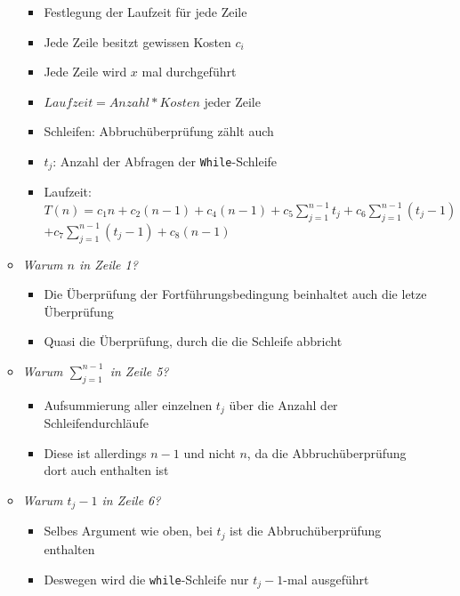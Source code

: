 \documentclass[
    12pt,
    a4paper,
    ngerman,
    color=3b,%
    marginpar=false,
    colorback=false,
    leqno,
]{tudaexercise}
\begin{document}
\begin{itemize}
\begin{itemize}
\begin{minipage}[t]{0.45\textwidth}
                        \vspace*{-2.5cm}
                        \begin{itemize}
                            \item Festlegung der Laufzeit für jede Zeile
                            \item Jede Zeile besitzt gewissen Kosten \texttt{$c_i$}
                            \item Jede Zeile wird $x$ mal durchgeführt
                            \item $Laufzeit = Anzahl * Kosten$ jeder Zeile
                            \item Schleifen: Abbruchüberprüfung zählt auch
                            \item \texttt{$t_j$}: Anzahl der Abfragen der \texttt{While}-Schleife
                            \item Laufzeit:
                            $T(n)=c_{1} n+c_{2}(n-1)+c_{4}(n-1)+c_{5} \sum_{j=1}^{n-1} t_{j}+c_{6} \sum_{j=1}^{n-1}\left(t_{j}-1\right)$\\$+c_{7} \sum_{j=1}^{n-1}\left(t_{j}-1\right)+c_{8}(n-1)$
                        \end{itemize}
                    \end{minipage}
                    \vspace*{-1.1em}
              \item \textit{Warum $n$ in Zeile 1?}
                    \begin{itemize}
                        \item Die Überprüfung der Fortführungsbedingung beinhaltet auch die letze Überprüfung
                        \item Quasi die Überprüfung, durch die die Schleife abbricht
                    \end{itemize}

              \item \textit{Warum $\sum^{n-1}_{j=1}$ in Zeile 5?}
                    \begin{itemize}
                        \item Aufsummierung aller einzelnen $t_j$ über die Anzahl der Schleifendurchläufe
                        \item Diese ist allerdings $n-1$ und nicht $n$, da die Abbruchüberprüfung dort auch enthalten ist
                    \end{itemize}

              \item \textit{Warum $t_j-1$ in Zeile 6?}
                    \begin{itemize}
                        \item Selbes Argument wie oben, bei $t_j$ ist die Abbruchüberprüfung enthalten
                        \item Deswegen wird die \texttt{while}-Schleife nur $t_j-1$-mal ausgeführt
                    \end{itemize}


\end{itemize}
\end{itemize}
\end{document}
